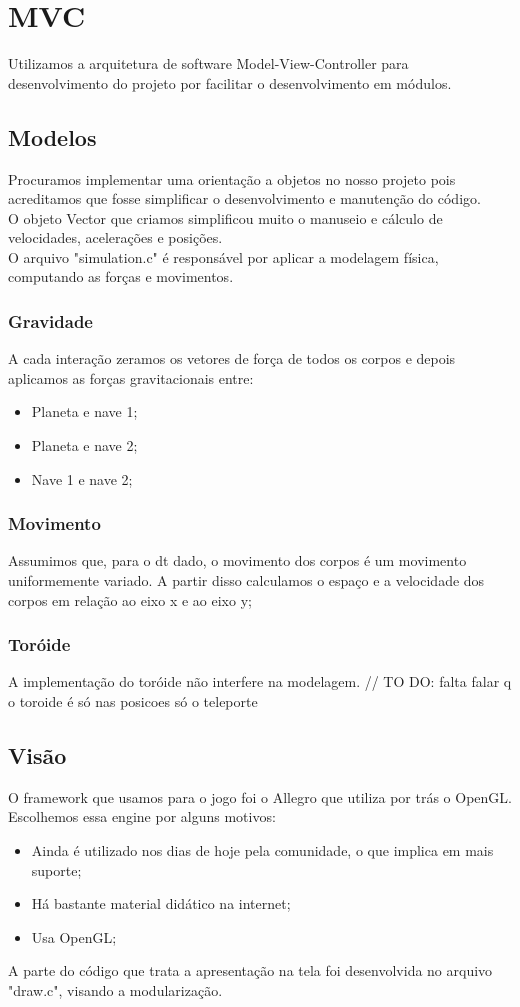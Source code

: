 \documentclass{article}
\begin{document}
\section{MVC}
Utilizamos a arquitetura de software Model-View-Controller para desenvolvimento do projeto por facilitar o desenvolvimento em módulos.

\subsection{Modelos}
Procuramos implementar uma orientação a objetos no nosso projeto pois acreditamos que fosse simplificar o desenvolvimento e manutenção do
código. \\
O objeto Vector que criamos simplificou muito o manuseio e cálculo de velocidades, acelerações e posições. \\
O arquivo "simulation.c" é responsável por aplicar a modelagem física, computando as forças e movimentos.

\subsubsection{Gravidade}
A cada interação zeramos os vetores de força de todos os corpos e depois aplicamos as forças gravitacionais entre:
\begin{itemize}
\item Planeta e nave 1;
\item Planeta e nave 2;
\item Nave 1 e nave 2;
\end{itemize}

\subsubsection{Movimento}
Assumimos que, para o dt dado, o movimento dos corpos é um movimento uniformemente variado. A partir disso calculamos o espaço e a velocidade dos corpos em relação ao eixo x e ao eixo y;

\subsubsection{Toróide}
A implementação do toróide não interfere na modelagem. // TO DO: falta falar q o toroide é só nas posicoes só o teleporte

\subsection{Visão}
O framework que usamos para o jogo foi o Allegro que utiliza por trás o OpenGL. Escolhemos essa engine por alguns motivos: \\
\begin{itemize}
    \item Ainda é utilizado nos dias de hoje pela comunidade, o que implica em mais suporte;
    \item Há bastante material didático na internet;
    \item Usa OpenGL;
\end{itemize}
A parte do código que trata a apresentação na tela foi desenvolvida no arquivo "draw.c", visando a modularização.
\end{document}
